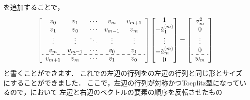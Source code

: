 を追加することで，
\begin{align}
\left[
\begin{array}{ccccc}
v_{0}&v_{1}&\cdots&v_{m}&v_{m+1}\\
v_1&v_0&\cdots&v_{m-1}&v_{m}\\
\vdots&\vdots&\ddots&\vdots&\vdots\\
v_{m}&v_{m-1}&\cdots&v_{0}&v_{1}\\
\hdashline
v_{m+1}&v_{m}&\cdots&v_{1}&v_{0}
\end{array}
\right]
\begin{bmatrix}
1\\
-\hat{a}_1^{(m)}\\
\vdots\\
-\hat{a}_m^{(m)}\\
0
\end{bmatrix}
=
\left[
\begin{array}{c}
\sigma_m^2\\
0\\
\vdots\\
0\\
\hdashline
w_{m}
\end{array}
\right]
\label{eq:LevinsonDurbin_4}
\end{align}
と書くことができます．
これでの左辺の行列をの左辺の行列と同じ形とサイズにすることができました．
ここで，左辺の行列が対称かつToeplitz型になっているので，において
左辺と右辺のベクトルの要素の順序を反転させたもの
